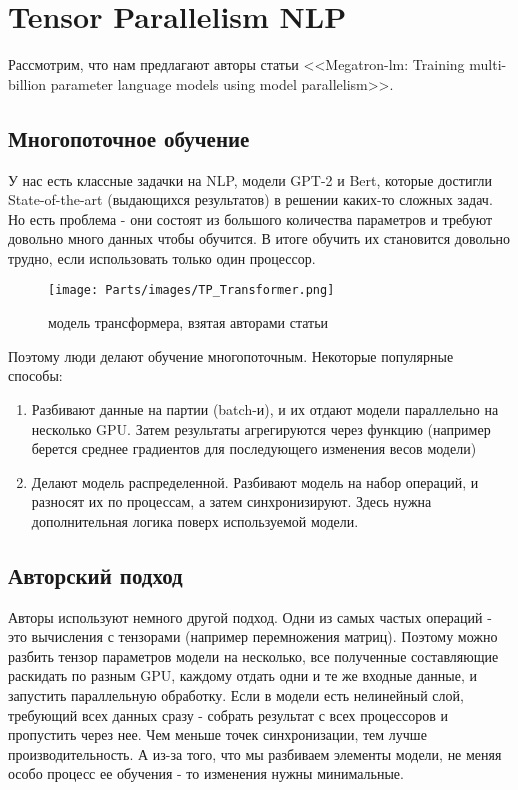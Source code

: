 
\section{Tensor Parallelism NLP}

Рассмотрим, что нам предлагают авторы статьи <<Megatron-lm: Training multi-billion parameter language models using model parallelism>>\cite{shoeybi2019megatron}.

\subsection{Многопоточное обучение}

У нас есть классные задачки на NLP, модели GPT-2 и Bert, которые достигли State-of-the-art (выдающихся результатов) в решении каких-то сложных задач. Но есть проблема - они состоят из большого количества параметров и требуют довольно много данных чтобы обучится. В итоге обучить их становится довольно трудно, если использовать только один процессор.

\begin{wrapfigure}[30]{r}{0.55\textwidth}
	\begin{center}
        \texttt{[image: Parts/images/TP\_Transformer.png]}
	\end{center}
	\caption{модель трансформера, взятая авторами статьи}
    \label{fig:transformer1}
\end{wrapfigure}

Поэтому люди делают обучение многопоточным. Некоторые популярные способы: 
\begin{enumerate}
    \item Разбивают данные на партии (batch-и), и их отдают модели параллельно на несколько GPU. Затем результаты агрегируются через функцию (например берется среднее градиентов для последующего изменения весов модели)
    \item  Делают модель распределенной. Разбивают модель на набор операций, и разносят их по процессам, а затем синхронизируют. Здесь нужна дополнительная логика поверх используемой модели. 
\end{enumerate}


\subsection{Авторский подход}
Авторы используют немного другой подход. Одни из самых частых операций - это вычисления с тензорами (например перемножения матриц). Поэтому можно разбить тензор параметров модели на несколько, все полученные составляющие раскидать по разным GPU, каждому отдать одни и те же входные данные, и запустить параллельную обработку. Если в модели есть нелинейный слой, требующий всех данных сразу - собрать результат с всех процессоров и пропустить через нее. Чем меньше точек синхронизации, тем лучше производительность. А из-за того, что мы разбиваем элементы модели, не меняя особо процесс ее обучения - то изменения нужны минимальные.


